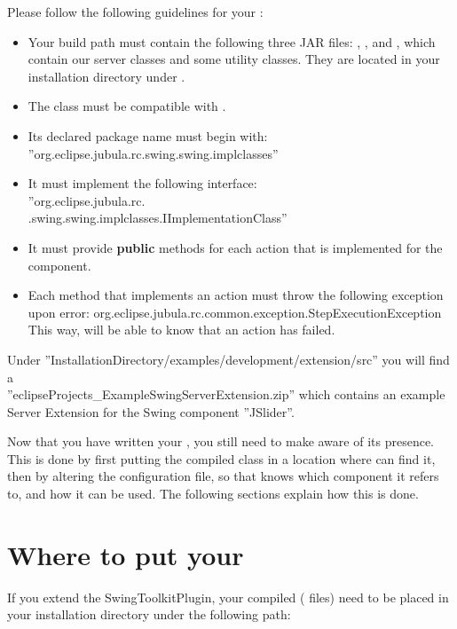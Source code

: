 Please follow the following guidelines for your \gdtesterclasses:
\begin{itemize}
  \item Your build path must contain the following three JAR files:
  , , and
  , which contain our server classes and some utility classes. They are located in your \app{} installation directory under
  .
  \item The class must be compatible with .
  \item Its declared package name must begin with: \\
    ''org.eclipse.jubula.rc.swing.swing.implclasses''
  \item It must implement the following interface: \\
    ''org.eclipse.jubula.rc.\\.swing.swing.implclasses.IImplementationClass''
  \item It must provide \textbf{public} methods for each action that is implemented for the component.
  \item Each method that implements an action must throw the following exception upon error:
    org.eclipse.jubula.rc.common.exception.StepExecutionException
    This way, \app{} will be able to know that an action has failed.
\end{itemize}

Under ''InstallationDirectory/examples/development/extension/src''
you will find a \\ ''eclipseProjects\_ExampleSwingServerExtension.zip'' which contains
 an example \app{} Server Extension for the Swing component ''JSlider''.

Now that you have written your \gdtesterclass, you still need to
make \app{} aware of its presence. This is done by first putting the
compiled class in a
location where \app{} can find it, then by altering the configuration
file, so that \app{} knows which component it refers to, and how it can
be used. The following sections explain how this is done.

\section{Where to put your \gdtesterclasses}
If you extend the SwingToolkitPlugin, your compiled \gdtesterclasses ( files) need to
be placed in your \app{} installation directory under the following path:

